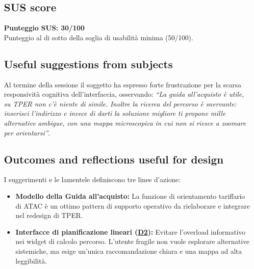 ﻿\documentclass[11pt,a4paper]{article}
\begin{document}
\subsection*{SUS score}
\begin{tcolorbox}[base]
\textbf{Punteggio SUS: 30/100}\\[0.2cm]
\small Punteggio al di sotto della soglia di
usabilità minima (50/100).
\end{tcolorbox}

\subsection*{Useful suggestions from subjects}
\begin{tcolorbox}[base]
Al termine della sessione il soggetto ha espresso forte frustrazione per la scarsa responsività cognitiva dell'interfaccia, osservando:
\textit{``La guida all'acquisto è utile, su TPER non c'è niente di simile. Inoltre la ricerca del percorso è snervante: inserisci l'indirizzo e invece di darti la soluzione migliore ti propone mille alternative ambigue, con una mappa microscopica in cui non si riesce a zoomare per orientarsi''}.

\end{tcolorbox}

\subsection*{Outcomes and reflections useful for design}
\begin{tcolorbox}[base]
\noindent I suggerimenti e le lamentele definiscono tre linee d'azione:
\begin{itemize}[leftmargin=*]
    \item \textbf{Modello della Guida all'acquisto:} La funzione di orientamento tariffario di ATAC è un ottimo pattern di supporto operativo da rielaborare e integrare nel redesign di TPER.
    \item \textbf{Interfacce di pianificazione lineari (\hyperref[atac:D2]{D2}):} Evitare l'overload informativo nei widget di calcolo percorso. L'utente fragile non vuole esplorare alternative sistemiche, ma esige un'unica raccomandazione chiara e una mappa ad alta leggibilità.
\end{itemize}
\end{tcolorbox}

\end{document}

